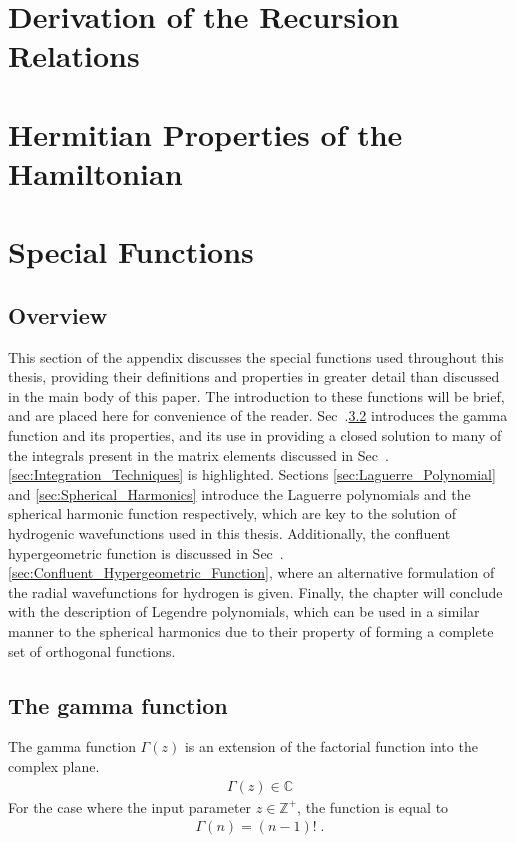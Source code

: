 \chapter{Derivation of the Recursion Relations}
\chapter{Hermitian Properties of the Hamiltonian} \label{sec:Hermitian_Left}
\chapter{Special Functions}
    \section{Overview}
        This section of the appendix discusses the special functions used throughout this thesis, providing their definitions and properties in greater detail than discussed in the main body of this paper. The introduction to these functions will be brief, and are placed here for convenience of the reader. Sec~.\ref{sec:Gamma_Function} introduces the gamma function and its properties, and its use in providing a closed solution to many of the integrals present in the matrix elements discussed in Sec~.\ref{sec:Integration_Techniques} is highlighted. Sections \ref{sec:Laguerre_Polynomial} and \ref{sec:Spherical_Harmonics} introduce the Laguerre polynomials and the spherical harmonic function respectively, which are key to the solution of hydrogenic wavefunctions used in this thesis. Additionally, the confluent hypergeometric function is discussed in Sec~.\ref{sec:Confluent_Hypergeometric_Function}, where an alternative formulation of the radial wavefunctions for hydrogen is given. Finally, the chapter will conclude with the description of Legendre polynomials, which can be used in a similar manner to the spherical harmonics due to their property of forming a complete set of orthogonal functions.
    \section{The gamma function} \label{sec:Gamma_Function}
        The gamma function $\Gamma(z)$ is an extension of the factorial function into the complex plane. 
        \begin{align}
            \Gamma(z) \in \mathbb{C} 
        \end{align}
        For the case where the input parameter $z \in \mathbb{Z}^+$, the function is equal to \cite{Arfken_Weber_Arfken_Weber_2008}
        \begin{align}
            \Gamma(n) = (n - 1)!\;.
        \end{align}

